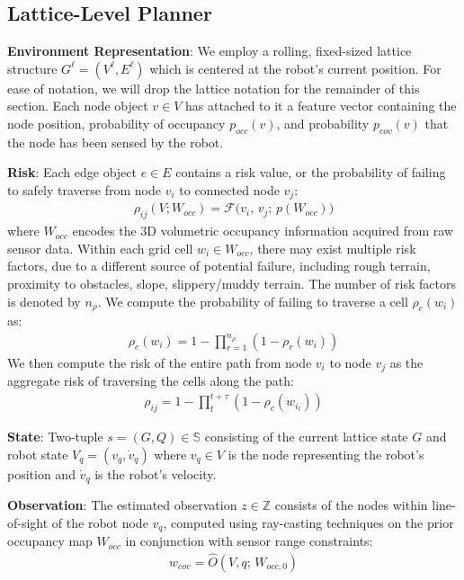 \documentclass{article}
\newcommand{\ph}[1]{{\textbf{#1}:}} %
\begin{document}
\subsection{Lattice-Level Planner} 

\ph{Environment Representation} We employ a rolling, fixed-sized lattice structure $G^\ell = (V^\ell, E^\ell)$ which is centered at the robot's current position. For ease of notation, we will drop the lattice notation for the remainder of this section. Each node object $v \in V$ has attached to it a feature vector containing the node position, probability of occupancy $p_{occ}(v)$, and probability $p_{cov}(v)$ that the node has been sensed by the robot. 

\ph{Risk} Each edge object $e \in E$ contains a risk value, or the probability of failing to safely traverse from node $v_i$ to connected node $v_j$:
\begin{align}
    \rho_{ij}(V; W_{occ}) = \mathcal{F} \big(v_i, \, v_j; \, p(W_{occ})\big)
\end{align}
where $W_{occ}$ encodes the 3D volumetric occupancy information acquired from raw sensor data. Within each grid cell $w_i \in W_{occ}$, there may exist multiple risk factors, due to a different source of potential failure, including rough terrain, proximity to obstacles, slope, slippery/muddy terrain. The number of risk factors is denoted by $n_\rho$. We compute the probability of failing to traverse a cell $\rho_c(w_i)$ as:
\begin{align}
    \rho_c(w_i) = 1-\prod_{r=1}^{n_\rho} (1-\rho_r(w_i))
\end{align}
We then compute the risk of the entire path from node $v_i$ to node $v_j$ as the aggregate risk of traversing the cells along the path:
\begin{align}
    \rho_{ij} = 1-\prod_t^{t+\tau}(1-\rho_c(w_{i_t}))
\end{align}


\ph{State} Two-tuple $s=(G, Q)  \in \mathbb{S}$ consisting of the current lattice state $G$ and robot state $V_q = (v_q, \dot{v}_q)$ where $v_q \in V$ is the node representing the robot's position and $\dot{v}_q$ is the robot's velocity. 

\ph{Observation} The estimated observation $z \in \mathbb{Z}$ consists of the nodes within line-of-sight of the robot node $v_q$, computed using ray-casting techniques on the prior occupancy map $W_{occ}$ in conjunction with sensor range constraints:
\begin{align}
    w_{cov} = \hat{O}(V, q; \, W_{occ,0}) 
\end{align}
\end{document}
